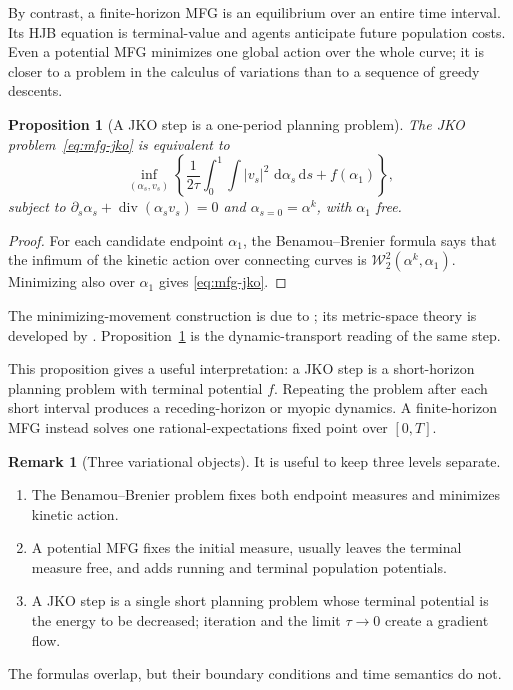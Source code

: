 \documentclass[11pt,a4paper]{article}
\newtheorem{proposition}[theorem]{Proposition}
\theoremstyle{definition}
\newtheorem{remark}[theorem]{Remark}
\newcommand{\Wass}{\mathcal W}
\newcommand{\diverg}{\operatorname{div}}
\newcommand{\dd}{\,\mathrm d}
\newcommand{\abs}[1]{\left\lvert#1\right\rvert}
\newcommand{\al}{\alpha}
\begin{document}
By contrast, a finite-horizon MFG is an equilibrium over an entire time
interval.  Its HJB equation is terminal-value and agents anticipate future
population costs.  Even a potential MFG minimizes one global action over the
whole curve; it is closer to a problem in the calculus of variations than to a
sequence of greedy descents.

\begin{proposition}[A JKO step is a one-period planning problem]
\label{prop:jko-as-planning}
The JKO problem~\eqref{eq:mfg-jko} is equivalent to
\begin{equation}\label{eq:jko-dynamic-planning}
  \inf_{(\al_s,v_s)}
  \left\{
    \frac1{2\tau}\int_0^1\int\abs{v_s}^2\,\dd\al_s\dd s
    +f(\al_1)
  \right\},
\end{equation}
subject to
$\partial_s\al_s+\diverg(\al_sv_s)=0$ and
$\al_{s=0}=\al^k$, with $\al_1$ free.
\end{proposition}

\begin{proof}
For each candidate endpoint $\al_1$, the Benamou--Brenier formula says that
the infimum of the kinetic action over connecting curves is
$\Wass_2^2(\al^k,\al_1)$.  Minimizing also over $\al_1$ gives
\eqref{eq:mfg-jko}.
\end{proof}

The minimizing-movement construction is due to
\citet{JordanKinderlehrerOtto1998}; its metric-space theory is developed by
\citet{AmbrosioGigliSavare2008}.  Proposition~\ref{prop:jko-as-planning} is
the dynamic-transport reading of the same step.

This proposition gives a useful interpretation: a JKO step is a short-horizon
planning problem with terminal potential $f$.  Repeating the problem after
each short interval produces a receding-horizon or myopic dynamics.  A
finite-horizon MFG instead solves one rational-expectations fixed point over
$[0,T]$.

\begin{remark}[Three variational objects]
It is useful to keep three levels separate.
\begin{enumerate}[leftmargin=2em]
  \item The Benamou--Brenier problem fixes both endpoint measures and minimizes
  kinetic action.
  \item A potential MFG fixes the initial measure, usually leaves the terminal
  measure free, and adds running and terminal population potentials.
  \item A JKO step is a single short planning problem whose terminal potential
  is the energy to be decreased; iteration and the limit $\tau\to0$ create a
  gradient flow.
\end{enumerate}
The formulas overlap, but their boundary conditions and time semantics do not.
\end{remark}
\end{document}
